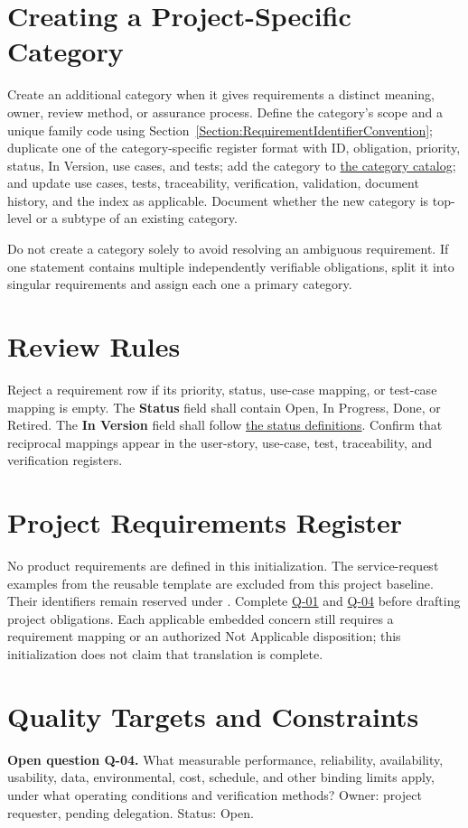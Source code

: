 \section{Creating a Project-Specific Category}
Create an additional category when it gives requirements a distinct meaning,
owner, review method, or assurance process. Define the category's scope and a
unique family code using
Section~\ref{Section:RequirementIdentifierConvention}; duplicate one of the
category-specific register format with ID, obligation, priority, status,
In Version, use cases, and tests; add the category to
\hyperref[Table:RequirementCategoryCatalog]{the category catalog}; and update
use cases, tests, traceability, verification, validation, document history, and
the index as applicable. Document whether the new category is top-level or a
subtype of an existing category.

Do not create a category solely to avoid resolving an ambiguous requirement.
If one statement contains multiple independently verifiable obligations, split
it into singular requirements and assign each one a primary category.

\section{Review Rules}
Reject a requirement row if its priority, status, use-case mapping, or test-case
mapping is empty. The \textbf{Status} field shall contain Open, In Progress,
Done, or Retired. The \textbf{In Version} field shall follow
\hyperref[Table:RequirementStatusDefinitions]{the status definitions}. Confirm
that reciprocal mappings appear in the user-story, use-case, test,
traceability, and verification registers.

\section{Project Requirements Register}
No product requirements are defined in this initialization. The service-request
examples from the reusable template are excluded from this project baseline.
Their identifiers remain reserved under .
Complete \hyperref[Question:Q-01]{Q-01} and \hyperref[Question:Q-04]{Q-04}
before drafting project obligations. Each applicable embedded concern still
requires a requirement mapping or an authorized Not Applicable disposition;
this initialization does not claim that translation is complete.
\section{Quality Targets and Constraints}
\label{Question:Q-04}
\par\noindent\textbf{Open question Q-04.} What measurable performance, reliability, availability, usability, data, environmental, cost, schedule, and other binding limits apply, under what operating conditions and verification methods? Owner: project requester, pending delegation. Status: Open.
